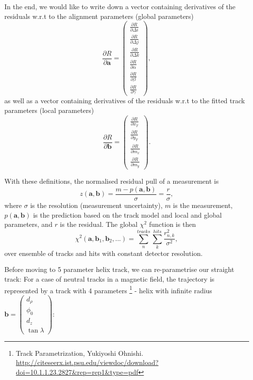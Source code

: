 \documentclass[a4paper,11pt]{article}
\begin{document}
In the end, we would like to write down a vector containing derivatives of the residuals w.r.t to the alignment parameters (global parameters)
\begin{equation}
\frac{\partial R}{\partial \textbf{a}} = \begin{pmatrix} \frac{\partial R}{\partial\Delta i} \\ \frac{\partial R}{\partial\Delta j} \\ \frac{\partial R}{\partial\Delta k} \\ \frac{\partial R}
{\partial\alpha} \\ \frac{\partial R}{\partial\beta} \\ \frac{\partial R}{\partial\gamma} \end{pmatrix},
\end{equation}
as well as a vector containing derivatives of the residuals w.r.t to the fitted track parameters (local parameters)
\begin{equation}
\frac{\partial R}{\partial \textbf{b}} = \begin{pmatrix} \frac{\partial R}{\partial x_T} \\ \frac{\partial R}{\partial y_T} \\ \frac{\partial R}{\partial m_x} \\ \frac{\partial R}{\partial m_y}  \end{pmatrix}.
\end{equation}

With these definitions, the normalised residual pull of a measurement is
\begin{equation}
z(\textbf{a}, \textbf{b}) = \frac{m-p(\textbf{a}, \textbf{b})}{\sigma} = \frac{r}{\sigma},
\end{equation}
where $\sigma$ is the resolution (measurement uncertainty), $m$ is the measurement, $p(\textbf{a}, \textbf{b})$ is the prediction based on the track model and local and global parameters, and $r$ is the residual. The global $\chi^2$ function is then
\begin{equation}
\chi^2(\textbf{a}, \textbf{b}_1,\textbf{b}_2, ...) = \sum_{n}^{tracks}\sum_{k}^{hits}  \frac{r_{n,k}^2}{\sigma^2},
\end{equation}
over ensemble of tracks and hits with constant detector resolution.  



Before moving to 5 parameter helix track, we can re-parametrise our straight track:
For a case of neutral tracks in a magnetic field, the trajectory is represented by a track with 4 parameters \footnote{Track Parametrization, Yukiyoshi Ohnishi. \url{http://citeseerx.ist.psu.edu/viewdoc/download?doi=10.1.1.23.2827&rep=rep1&type=pdf}} - helix with infinite radius $\textbf{b} = \begin{pmatrix} d_\rho \\ \phi_0 \\ d_z \\ \tan \lambda \end{pmatrix}$:
\end{document}
